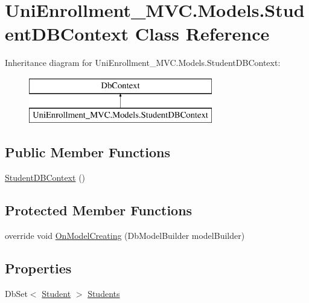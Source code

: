 \hypertarget{class_uni_enrollment___m_v_c_1_1_models_1_1_student_d_b_context}{}\section{Uni\+Enrollment\+\_\+\+M\+V\+C.\+Models.\+Student\+D\+B\+Context Class Reference}
\label{class_uni_enrollment___m_v_c_1_1_models_1_1_student_d_b_context}
Inheritance diagram for Uni\+Enrollment\+\_\+\+M\+V\+C.\+Models.\+Student\+D\+B\+Context\+:\begin{figure}[H]
\begin{center}
\leavevmode
\includegraphics[height=2.000000cm]{class_uni_enrollment___m_v_c_1_1_models_1_1_student_d_b_context}
\end{center}
\end{figure}
\subsection*{Public Member Functions}
\begin{DoxyCompactItemize}
\item 
\hyperlink{class_uni_enrollment___m_v_c_1_1_models_1_1_student_d_b_context_a3955c9a6087bbe3d35e26ef879e434f5}{Student\+D\+B\+Context} ()
\end{DoxyCompactItemize}
\subsection*{Protected Member Functions}
\begin{DoxyCompactItemize}
\item 
override void \hyperlink{class_uni_enrollment___m_v_c_1_1_models_1_1_student_d_b_context_acf86c8dca4f75af696d6b75b21d041b6}{On\+Model\+Creating} (Db\+Model\+Builder model\+Builder)
\end{DoxyCompactItemize}
\subsection*{Properties}
\begin{DoxyCompactItemize}
\item 
Db\+Set$<$ \hyperlink{class_uni_enrollment___m_v_c_1_1_models_1_1_student}{Student} $>$ \hyperlink{class_uni_enrollment___m_v_c_1_1_models_1_1_student_d_b_context_aaaf3781eca16f0b42266ee141900bfca}{Students}
\end{DoxyCompactItemize}


